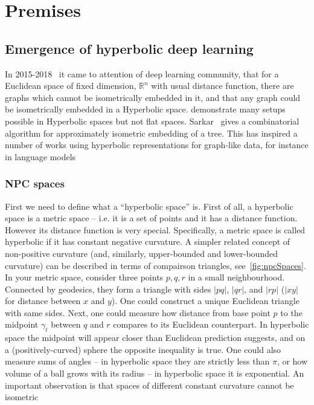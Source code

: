 %


\chapter{Premises} \label{chap:premises}

\section{Emergence of hyperbolic deep learning} \label{sec:history}

In
2015-2018~\cite{spaceTimeEmbeddings,nickelKiela17,embeddings2018dhingra,wilson2018gradient}
it came to attention of deep learning community, that for a
Euclidean space of fixed dimension, \( \mathbb{R}^n \) with usual distance
function, there are graphs which cannot be isometrically embedded in it, and
that any graph could be isometrically embedded in a Hyperbolic space.
\citet{spaceTimeEmbeddings} demonstrate many setups possible in Hyperbolic
spaces but not flat spaces.
Sarkar~\cite{sarkar} gives a combinatorial algorithm for approximately
isometric embedding of a tree. This has inspired a number of works using
hyperbolic representations for graph-like data, for instance in language models

\subsection*{NPC spaces}

First we need to define what a ``hyperbolic space'' is. First of all, a
hyperbolic space is a metric space -- i.e. it is a set of points and it has a
distance function. However its distance function is very special.
Specifically, a metric space is called hyperbolic if it has constant negative
curvature. A simpler related concept of non-positive curvature (and, similarly,
upper-bounded and lower-bounded curvature) can be described in terms of
compairson triangles, see~\autoref{fig:npcSpaces}. In your metric space,
consider three points $p, q, r$ in a small neighbourhood.  Connected by
geodesics, they form a triangle with sides $|pq|$, $|qr|$, and $|rp|$ ($|xy|$
for distance between $x$ and $y$).  One could construct a unique Euclidean
triangle with same sides. Next, one could
measure how distance from base point $p$ to the midpoint $\gamma_t$ between $q$
and $r$ compares to its Euclidean counterpart. In hyperbolic space the midpoint
will appear closer than Euclidean prediction suggests, and on a
(positively-curved) sphere the opposite inequality is true. One could also
measure sums of angles -- in hyperbolic space they are strictly less than
$\pi$, or how volume of a ball grows with its radius -- in hyperbolic space it
is exponential. An important observation is that spaces of different constant
curvature cannot be isometric

